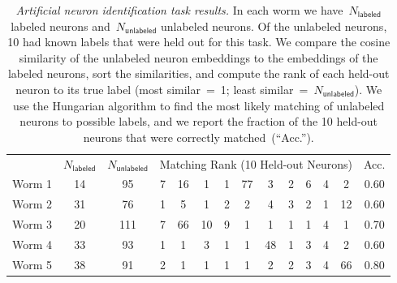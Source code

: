 \documentclass[11pt]{article}
\begin{document}
\begin{table}[h!]
  \caption{\textit{Artificial neuron identification task results.}  In
    each worm we have~$N_{\mathsf{labeled}}$ labeled neurons
    and~$N_{\mathsf{unlabeled}}$ unlabeled neurons. Of the unlabeled
    neurons, 10 had known labels that were held out for this task.  We
    compare the cosine similarity of the unlabeled neuron embeddings
    to the embeddings of the labeled neurons, sort the similarities,
    and compute the rank of each held-out neuron to its true label
    (most similar~=~1; least similar~=~$N_{\mathsf{unlabeled}}$).  We
    use the Hungarian algorithm to find the most likely matching of
    unlabeled neurons to possible labels, and we report the fraction
    of the 10 held-out neurons that were correctly matched~(``Acc.'').
  }
  \vspace{1em}
  \label{tab:neuron_id}
  \centering
  \begin{tabular}{cccccccccccccc}
    \toprule
    & $N_{\mathsf{labeled}}$ & $N_{\mathsf{unlabeled}}$ & \multicolumn{10}{c}{Matching Rank (10 Held-out Neurons)} & Acc. \\
    \cmidrule(r){2-2}
    \cmidrule(rl){3-3}
    \cmidrule(rl){4-13}
    \cmidrule(l){14-14}
    Worm 1 & 14 & 95 & 7 & 16 & 1 & 1 & 77 & 3 & 2 & 6 & 4 & 2 & 0.60 \\
    Worm 2 & 31 & 76 & 1 & 5 & 1 & 2 & 2 & 4 & 3 & 2 & 1 & 12 & 0.60 \\
    Worm 3 & 20 & 111 & 7 & 66 & 10 & 9 & 1 & 1 & 1 & 1 & 4 & 1 & 0.70 \\
    Worm 4 & 33 & 93 & 1 & 1 & 3 & 1 & 1 & 48 & 1 & 3 & 4 & 2 & 0.60 \\
    Worm 5 & 38 & 91 & 2 & 1 & 1 & 1 & 1 & 2 & 2 & 3 & 4 & 66 & 0.80 \\
    \bottomrule
  \end{tabular}
\end{table}

\end{document}
